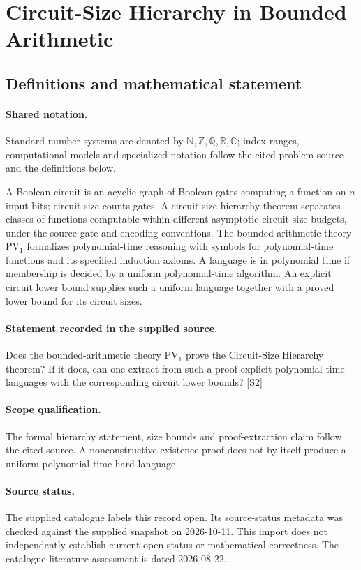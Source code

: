 \documentclass[11pt]{article}
\newcommand{\sref}[2]{\hyperlink{source:#1:#2}{[S#2]}}
\begin{document}
\section{Circuit-Size Hierarchy in Bounded Arithmetic}\label{statement}

\subsection{Definitions and mathematical statement}

\paragraph{Shared notation.}Standard number systems are denoted by $\mathbb N,\mathbb Z,\mathbb Q,\mathbb R,\mathbb C$; index ranges, computational models and specialized notation follow the cited problem source and the definitions below.


A Boolean circuit is an acyclic graph of Boolean gates computing a function on $n$ input bits; circuit size counts gates. A circuit-size hierarchy theorem separates classes of functions computable within different asymptotic circuit-size budgets, under the source gate and encoding conventions. The bounded-arithmetic theory $\mathrm{PV}_1$ formalizes polynomial-time reasoning with symbols for polynomial-time functions and its specified induction axioms. A language is in polynomial time if membership is decided by a uniform polynomial-time algorithm. An explicit circuit lower bound supplies such a uniform language together with a proved lower bound for its circuit sizes.
\paragraph{Statement recorded in the supplied source.}
Does the bounded-arithmetic theory $\mathrm{PV}_1$ prove the Circuit-Size Hierarchy theorem? If it does, can one extract from such a proof explicit polynomial-time languages with the corresponding circuit lower bounds? \sref{statement}{2}
\paragraph{Scope qualification.}
The formal hierarchy statement, size bounds and proof-extraction claim follow the cited source. A nonconstructive existence proof does not by itself produce a uniform polynomial-time hard language.
\paragraph{Source status.}
The supplied catalogue labels this record open. Its source-status metadata was checked against the supplied snapshot on 2026-10-11. This import does not independently establish current open status or mathematical correctness. The catalogue literature assessment is dated 2026-08-22.
\end{document}
